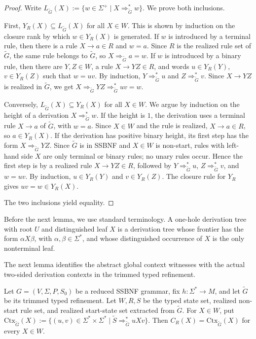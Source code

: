 \documentclass[sub]{jalc}
\newcommand{\Gtrim}{\widetilde G}
\begin{document}
\begin{proof}
Write \(L_{\Gtrim}(X):=\{w\in\Sigma^+\mid X\Rightarrow_{\Gtrim}^*w\}\). We prove both inclusions.

First, \(Y_R(X)\subseteq L_{\Gtrim}(X)\) for all \(X\in W\). This is shown by induction on the closure rank by which \(w\in Y_R(X)\) is generated. If \(w\) is introduced by a terminal rule, then there is a rule \(X\to a\in R\) and \(w=a\). Since \(R\) is the realized rule set of \(\Gtrim\), the same rule belongs to \(\Gtrim\), so \(X\Rightarrow_{\Gtrim} a=w\). If \(w\) is introduced by a binary rule, then there are \(Y,Z\in W\), a rule \(X\to YZ\in R\), and words \(u\in Y_R(Y)\), \(v\in Y_R(Z)\) such that \(w=uv\). By induction, \(Y\Rightarrow_{\Gtrim}^*u\) and \(Z\Rightarrow_{\Gtrim}^*v\). Since \(X\to YZ\) is realized in \(\Gtrim\), we get \(X\Rightarrow_{\Gtrim}YZ\Rightarrow_{\Gtrim}^*uv=w\).

Conversely, \(L_{\Gtrim}(X)\subseteq Y_R(X)\) for all \(X\in W\). We argue by induction on the height of a derivation \(X\Rightarrow_{\Gtrim}^* w\). If the height is \(1\), the derivation uses a terminal rule \(X\to a\) of \(\Gtrim\), with \(w=a\). Since \(X\in W\) and the rule is realized, \(X\to a\in R\), so \(a\in Y_R(X)\). If the derivation has positive binary height, its first step has the form \(X\Rightarrow_{\Gtrim}YZ\). Since \(\Gtrim\) is in SSBNF and \(X\in W\) is non-start, rules with left-hand side \(X\) are only terminal or binary rules; no unary rules occur. Hence the first step is by a realized rule \(X\to YZ\in R\), followed by \(Y\Rightarrow_{\Gtrim}^*u\), \(Z\Rightarrow_{\Gtrim}^*v\), and \(w=uv\). By induction, \(u\in Y_R(Y)\) and \(v\in Y_R(Z)\). The closure rule for \(Y_R\) gives \(uv=w\in Y_R(X)\).

The two inclusions yield equality.
\end{proof}

Before the next lemma, we use standard terminology. A one-hole derivation tree with root \(U\) and distinguished leaf \(X\) is a derivation tree whose frontier has the form \(\alpha X\beta\), with \(\alpha,\beta\in\Sigma^*\), and whose distinguished occurrence of \(X\) is the only nonterminal leaf.

The next lemma identifies the abstract global context witnesses with the actual two-sided derivation contexts in the trimmed typed refinement.

\begin{lemma}
\label{lem:context-closure-coincidence}
Let \(G=(V,\Sigma,P,S_0)\) be a reduced SSBNF grammar, fix \(h:\Sigma^*\to M\), and let \(\Gtrim\) be its trimmed typed refinement. Let \(W,R,S\) be the typed state set, realized non-start rule set, and realized start-state set extracted from \(\Gtrim\). For \(X\in W\), put \(\mathrm{Ctx}_{\Gtrim}(X):=\{(u,v)\in\Sigma^*\times\Sigma^*\mid \widetilde S\Rightarrow_{\Gtrim}^*uXv\}\). Then \(C_R(X)=\mathrm{Ctx}_{\Gtrim}(X)\) for every \(X\in W\).
\end{lemma}
\end{document}
